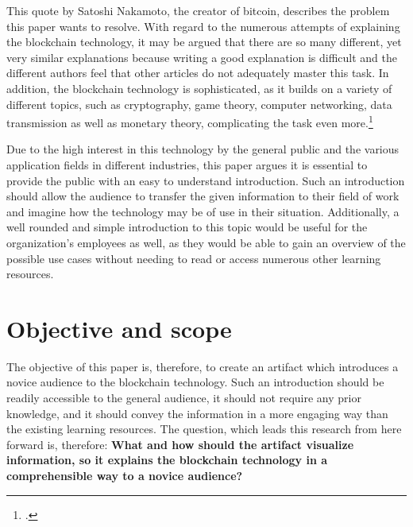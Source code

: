 This quote by Satoshi Nakamoto, the creator of bitcoin, describes the problem this paper wants to resolve. 
With regard to the numerous attempts of explaining the blockchain technology, it may be argued that there are so many different, yet very similar explanations because writing a good explanation is difficult and the different authors feel that other articles do not adequately master this task. In addition, the blockchain technology is sophisticated, as it builds on a variety of different topics, such as cryptography, game theory, computer networking, data transmission as well as monetary theory, complicating the task even more.\footcite[Cf.][]{LoppNobodyUnderstandsBitcoin2017} 

Due to the high interest in this technology by the general public and the various application fields in different industries, this paper argues it is essential to provide the public with an easy to understand introduction. Such an introduction should allow the audience to transfer the given information to their field of work and imagine how the technology may be of use in their situation. %
Additionally, a well rounded and simple introduction to this topic would be useful for the organization's employees as well, as they would be able to gain an overview of the possible use cases without needing to read or access numerous other learning resources.

\section{Objective and scope} \label{sec:Objective}

The objective of this paper is, therefore, to create an artifact which introduces a novice audience to the blockchain technology. Such an introduction should be readily accessible to the general audience, it should not require any prior knowledge, and it should convey the information in a more engaging way than the existing learning resources. The question, which leads this research from here forward is, therefore: \textbf{What and how should the artifact visualize information, so it explains the blockchain technology in a comprehensible way to a novice audience?}

